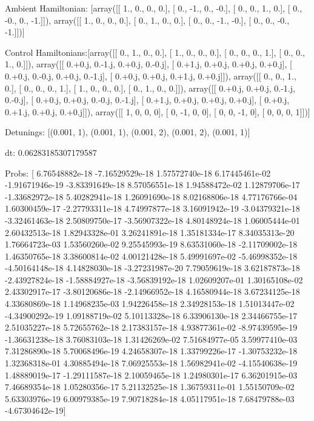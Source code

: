 \documentclass{article}
\begin{document}
    

\newpage

Ambient Hamiltonian: [array([[ 1.,  0.,  0.,  0.],
       [ 0., -1.,  0., -0.],
       [ 0.,  0.,  1.,  0.],
       [ 0., -0.,  0., -1.]]), array([[ 1.,  0.,  0.,  0.],
       [ 0.,  1.,  0.,  0.],
       [ 0.,  0., -1., -0.],
       [ 0.,  0., -0., -1.]])]

Control Hamiltonians:[array([[ 0.,  1.,  0.,  0.],
       [ 1.,  0.,  0.,  0.],
       [ 0.,  0.,  0.,  1.],
       [ 0.,  0.,  1.,  0.]]), array([[ 0.+0.j,  0.-1.j,  0.+0.j,  0.-0.j],
       [ 0.+1.j,  0.+0.j,  0.+0.j,  0.+0.j],
       [ 0.+0.j,  0.-0.j,  0.+0.j,  0.-1.j],
       [ 0.+0.j,  0.+0.j,  0.+1.j,  0.+0.j]]), array([[ 0.,  0.,  1.,  0.],
       [ 0.,  0.,  0.,  1.],
       [ 1.,  0.,  0.,  0.],
       [ 0.,  1.,  0.,  0.]]), array([[ 0.+0.j,  0.+0.j,  0.-1.j,  0.-0.j],
       [ 0.+0.j,  0.+0.j,  0.-0.j,  0.-1.j],
       [ 0.+1.j,  0.+0.j,  0.+0.j,  0.+0.j],
       [ 0.+0.j,  0.+1.j,  0.+0.j,  0.+0.j]]), array([[ 1,  0,  0,  0],
       [ 0, -1,  0,  0],
       [ 0,  0, -1,  0],
       [ 0,  0,  0,  1]])]

Detunings: [(0.001, 1), (0.001, 1), (0.001, 2), (0.001, 2), (0.001, 1)]

 dt: 0.06283185307179587

Probs: [  6.76548882e-18  -7.16529529e-18   1.57572740e-18   6.17445461e-02
  -1.91671946e-19  -3.83391649e-18   8.57056551e-18   1.94588472e-02
   1.12879706e-17  -1.33682972e-18   5.40282941e-18   1.26091690e-18
   8.02168806e-18   4.77176766e-04   1.60300459e-17  -2.27793311e-18
   4.74997877e-18   3.16091942e-19  -3.04379321e-18  -3.32461463e-18
   2.50809750e-17  -3.56907322e-18   4.80148924e-18   1.06005444e-01
   2.60432513e-18   1.82943328e-01   3.26241891e-18   1.35181334e-17
   8.34035313e-20   1.76664723e-03   1.53560260e-02   9.25545993e-19
   8.63531060e-18  -2.11709002e-18   1.46350765e-18   3.38600814e-02
   4.00121428e-18   5.49991697e-02  -5.46998352e-18  -4.50164148e-18
   4.14828030e-18  -3.27231987e-20   7.79059619e-18   3.62187873e-18
  -2.43927824e-18  -1.58884927e-18  -3.56839192e-18   1.02609207e-01
   1.30165108e-02   2.43302917e-17  -3.80120686e-18  -2.14966952e-18
   4.16580944e-18   3.67234125e-18   4.33680869e-18   1.14968235e-03
   1.94226458e-18   2.34928153e-18   1.51013447e-02  -4.34900292e-19
   1.09188719e-02   5.10113328e-18   6.33906130e-18   2.34466755e-17
   2.51035227e-18   5.72655762e-18   2.17383157e-18   4.93877361e-02
  -8.97439595e-19  -1.36631238e-18   3.76083103e-18   1.31426269e-02
   7.51684977e-05   3.59977410e-03   7.31286890e-18   5.70068496e-19
   4.24658307e-18   1.33799226e-17  -1.30753232e-18   1.32368318e-01
   4.30885494e-18   7.06925553e-18   1.56982941e-02  -4.15540638e-19
   1.48889019e-17  -1.29111587e-18   2.10059465e-18   1.24980301e-17
   6.36201915e-03   7.46689354e-18   1.05280356e-17   5.21132525e-18
   1.36759311e-01   1.55150709e-02   5.63303976e-19   6.00979385e-19
   7.90718284e-18   4.05117951e-18   7.68479788e-03  -4.67304642e-19]
\end{document}
